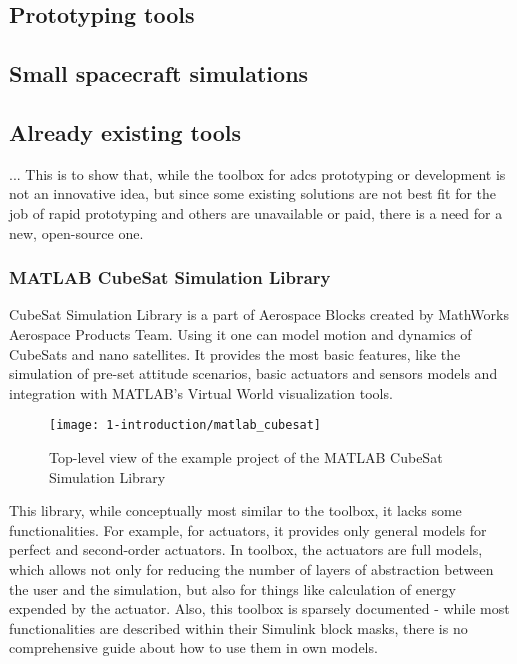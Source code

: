 \subsection{Prototyping tools}

\subsection{Small spacecraft simulations}

\subsection{Already existing tools}
    ... This is to show that, while the toolbox for \ac{adcs} prototyping or development is not an innovative idea, but since some existing solutions are not best fit for the job of rapid prototyping and others are unavailable or paid, there is a need for a new, open-source one.
    
    \subsubsection{MATLAB CubeSat Simulation Library}
        CubeSat Simulation Library is a part of Aerospace Blocks created by MathWorks Aerospace Products Team. Using it one can model motion and dynamics of CubeSats and nano satellites. It provides the most basic features, like the simulation of pre-set attitude scenarios, basic actuators and sensors models and integration with MATLAB's Virtual World visualization tools.
        
        \begin{figure}[h]
            \centering
            \texttt{[image: 1-introduction/matlab\_cubesat]}
            \caption{Top-level view of the example project of the MATLAB CubeSat Simulation Library}
            \label{fig:matlab_cubesat}
        \end{figure}

        This library, while conceptually most similar to the \ac{toolbox}, it lacks some functionalities. For example, for actuators, it provides only general models for perfect and second-order actuators. In \ac{toolbox}, the actuators are full models, which allows not only for reducing the number of layers of abstraction between the user and the simulation, but also for things like calculation of energy expended by the actuator. Also, this toolbox is sparsely documented - while most functionalities are described within their Simulink block masks, there is no comprehensive guide about how to use them in own models. 

